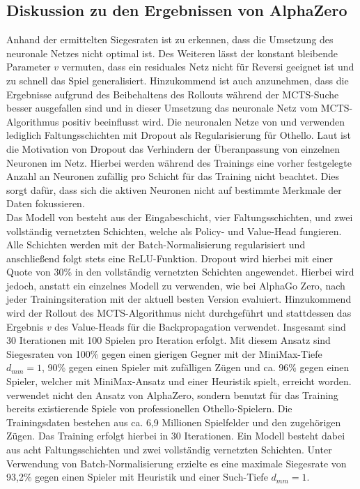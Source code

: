 \documentclass[12pt,a4paper,bibliography=totocnumbered,listof=totocnumbered]{article}
\begin{document}
\subsection{Diskussion zu den Ergebnissen von AlphaZero}
Anhand der ermittelten Siegesraten ist zu erkennen, dass die Umsetzung des neuronale Netzes nicht optimal ist. Des Weiteren lässt der konstant bleibende Parameter $v$ vermuten, dass ein residuales Netz nicht für Reversi geeignet ist und zu schnell das Spiel generalisiert. Hinzukommend ist auch anzunehmen, dass die Ergebnisse aufgrund des Beibehaltens des Rollouts während der MCTS-Suche besser ausgefallen sind und in dieser Umsetzung das neuronale Netz vom MCTS-Algorithmus positiv beeinflusst wird. Die neuronalen Netze von \cite{Shantanu.2018} und \cite{Liskowski.2018} verwenden lediglich Faltungsschichten mit Dropout als Regularisierung für Othello. Laut \cite{Hinton.03.07.2012} ist die Motivation von Dropout das Verhindern der Überanpassung von einzelnen Neuronen im Netz. Hierbei werden während des Trainings eine vorher festgelegte Anzahl an Neuronen zufällig pro Schicht für das Training nicht beachtet. Dies sorgt dafür, dass sich die aktiven Neuronen nicht auf bestimmte Merkmale der Daten fokussieren.\\
Das Modell von \cite{Shantanu.2018} besteht aus der Eingabeschicht, vier Faltungsschichten, und zwei vollständig vernetzten Schichten, welche als Policy- und Value-Head fungieren. Alle Schichten werden mit der Batch-Normalisierung regularisiert und anschließend folgt stets eine ReLU-Funktion. Dropout wird hierbei mit einer Quote von 30\% in den vollständig vernetzten Schichten angewendet. Hierbei wird jedoch, anstatt ein einzelnes Modell zu verwenden, wie bei AlphaGo Zero, nach jeder Trainingsiteration mit der aktuell besten Version evaluiert. Hinzukommend wird der Rollout des MCTS-Algorithmus nicht durchgeführt und stattdessen das Ergebnis $v$ des Value-Heads für die Backpropagation verwendet. Insgesamt sind 30 Iterationen mit 100 Spielen pro Iteration erfolgt. Mit diesem Ansatz sind Siegesraten von 100\% gegen einen gierigen Gegner mit der MiniMax-Tiefe $d_{mm}=1$, 90\% gegen einen Spieler mit zufälligen Zügen und ca. 96\%  gegen einen Spieler, welcher mit MiniMax-Ansatz und einer Heuristik spielt, erreicht worden.\\
\cite{Liskowski.2018} verwendet nicht den Ansatz von AlphaZero, sondern benutzt für das Training bereits existierende Spiele von professionellen Othello-Spielern. Die Trainingsdaten bestehen aus ca. 6,9 Millionen Spielfelder und den zugehörigen Zügen. Das Training erfolgt hierbei in 30 Iterationen. Ein Modell besteht dabei aus acht Faltungsschichten und zwei vollständig vernetzten Schichten. Unter Verwendung von Batch-Normalisierung erzielte es eine maximale Siegesrate von 93,2\% gegen einen Spieler mit Heuristik und einer Such-Tiefe $d_{mm}=1$.\\
\end{document}
